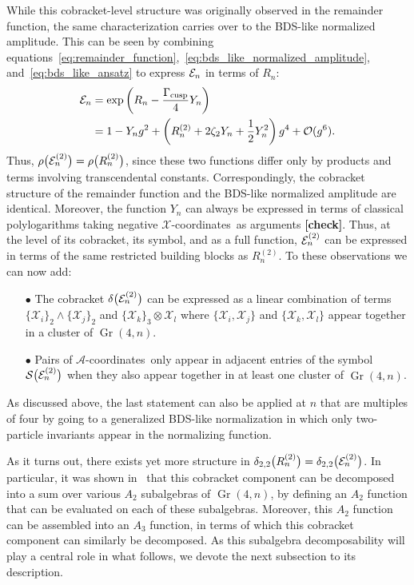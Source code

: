 \documentclass[11pt]{article}
\DeclareMathOperator{\Gr}{Gr}
\def\x{\mathcal{X}}
\def\xcoords{$\mathcal{X}$-coordinates}
\def\acoords{$\mathcal{A}$-coordinates}
\def\draftnote#1{{\bf [#1]}}
\begin{document}
While this cobracket-level structure was originally observed in the remainder function, the same characterization carries over to the BDS-like normalized amplitude. This can be seen by combining equations~\eqref{eq:remainder_function},~\eqref{eq:bds_like_normalized_amplitude}, and~\eqref{eq:bds_like_ansatz} to express ${\cal E}_n$ in terms of $R_n$:
\begin{align}
{\cal E}_n &= \exp \left(R_n- \frac{\Gamma_{\text{cusp}}}{4} Y_n \right) \\
&= 1 - Y_n g^2 + \left(R_n^{(2)} + 2 \zeta_2 Y_n + \frac{1}{2} Y_n^2 \right) g^4 + \mathcal{O}(g^6). \nonumber
\end{align} 
Thus, $\rho \big({\cal E}_n^{(2)}\big) = \rho \big(R_n^{(2)} \big)$, since these two functions differ only by products and terms involving transcendental constants. Correspondingly, the cobracket structure of the remainder function and the BDS-like normalized amplitude are identical. Moreover, the function $Y_n$ can always be expressed in terms of classical polylogarithms taking negative \xcoords\ as arguments \draftnote{check}. Thus, at the level of its cobracket, its symbol, and as a full function, ${\cal E}^{(2)}_n$ can be expressed in terms of the same restricted building blocks as $R^{(2)}_n$. To these observations we can now add:
\begin{itemize}
\item[$\bullet$] The cobracket $\delta\big({\cal E}^{(2)}_n\big)$ can be expressed as a linear combination of terms $\{\x_i\}_2 \wedge \{\x_j\}_2$ and $\{\x_k\}_3 \otimes \x_l$ where $\{\x_i,\x_j\}$ and $\{\x_k,\x_l\}$ appear together in a cluster of $\Gr(4,n)$.
\item[$\bullet$] Pairs of \acoords\ only appear in adjacent entries of the symbol ${\cal S} \big({\cal E}^{(2)}_n\big)$ when they also appear together in at least one cluster of $\Gr(4,n)$.
\end{itemize}
As discussed above, the last statement can also be applied at $n$ that are multiples of four by going to a generalized BDS-like normalization in which only two-particle invariants appear in the normalizing function.

As it turns out, there exists yet more structure in $\delta_{2,2}\big(R^{(2)}_n\big) = \delta_{2,2}\big({\cal E}^{(2)}_n\big)$. In particular, it was shown in~\cite{Golden:2014xqa} that this cobracket component can be decomposed into a sum over various $A_2$ subalgebras of $\Gr(4,n)$, by defining an $A_2$ function that can be evaluated on each of these subalgebras. Moreover, this $A_2$ function can be assembled into an $A_3$ function, in terms of which this cobracket component can similarly be decomposed. As this subalgebra decomposability will play a central role in what follows, we devote the next subsection to its description.
\end{document}
